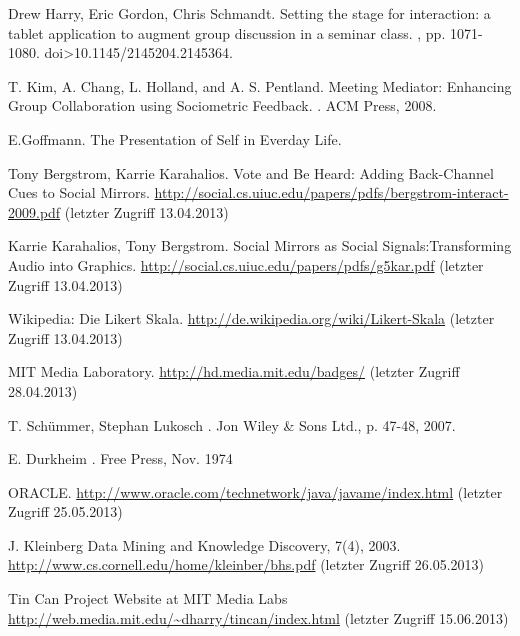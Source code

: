 \documentclass{seminarvorlage}
\begin{document}
\begin{thebibliography}{[9]}

Drew Harry, Eric Gordon, Chris Schmandt.
\newblock Setting the stage for interaction: a tablet application to augment group discussion in a seminar class. 
, pp. 1071-1080. doi>10.1145/2145204.2145364. 


T. Kim, A. Chang, L. Holland, and A. S. Pentland.
\newblock Meeting Mediator: Enhancing Group Collaboration using Sociometric Feedback. 
. ACM Press, 2008.

E.Goffmann.
\newblock The Presentation of Self in Everday Life.

Tony Bergstrom, Karrie Karahalios. 
\newblock Vote and Be Heard: Adding Back-Channel Cues to Social Mirrors.
 \url {http://social.cs.uiuc.edu/papers/pdfs/bergstrom-interact-2009.pdf} (letzter Zugriff 13.04.2013)

Karrie Karahalios, Tony Bergstrom. 
\newblock Social Mirrors as Social Signals:Transforming Audio into Graphics.
 \url {http://social.cs.uiuc.edu/papers/pdfs/g5kar.pdf} (letzter Zugriff 13.04.2013)

Wikipedia: Die Likert Skala.
\newblock \url {http://de.wikipedia.org/wiki/Likert-Skala} (letzter Zugriff 13.04.2013)

 MIT Media Laboratory. 
\newblock \url {http://hd.media.mit.edu/badges/} (letzter Zugriff 28.04.2013)

T. Schümmer, Stephan Lukosch
. Jon Wiley \& Sons Ltd., p. 47-48, 2007.

E. Durkheim
. Free Press, Nov. 1974

 ORACLE. 
\newblock \url {http://www.oracle.com/technetwork/java/javame/index.html}
(letzter Zugriff 25.05.2013)

J. Kleinberg Data Mining and Knowledge Discovery, 7(4),
2003.
\newblock \url {http://www.cs.cornell.edu/home/kleinber/bhs.pdf} (letzter Zugriff 26.05.2013)


Tin Can Project Website at MIT Media Labs
\newblock \url {http://web.media.mit.edu/~dharry/tincan/index.html} (letzter Zugriff 15.06.2013)


\end{thebibliography}
\end{document}
